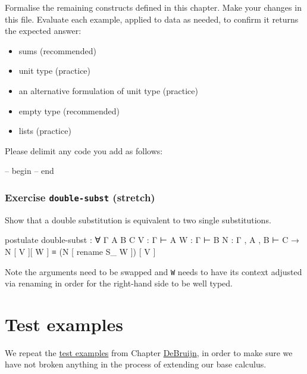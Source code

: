 Formalise the remaining constructs defined in this chapter. Make your
changes in this file. Evaluate each example, applied to data as needed,
to confirm it returns the expected answer:

\begin{itemize}
\tightlist
\item
  sums (recommended)
\item
  unit type (practice)
\item
  an alternative formulation of unit type (practice)
\item
  empty type (recommended)
\item
  lists (practice)
\end{itemize}

Please delimit any code you add as follows:

\begin{myDisplay}
-- begin
-- end
\end{myDisplay}

\hypertarget{exercise-double-subst-stretch}{%
\subsubsection{\texorpdfstring{Exercise \texttt{double-subst}
(stretch)}{Exercise double-subst (stretch)}}\label{exercise-double-subst-stretch}}

Show that a double substitution is equivalent to two single
substitutions.

\begin{fence}
\begin{code}
postulate
  double-subst :
    ∀ {Γ A B C} {V : Γ ⊢ A} {W : Γ ⊢ B} {N : Γ , A , B ⊢ C} →
      N [ V ][ W ] ≡ (N [ rename S_ W ]) [ V ]
\end{code}
\end{fence}

Note the arguments need to be swapped and \texttt{W} needs to have its
context adjusted via renaming in order for the right-hand side to be
well typed.

\hypertarget{test-examples}{%
\section{Test examples}\label{test-examples}}

We repeat the \protect\hyperlink{DeBruijn-examples}{test examples} from
Chapter \protect\hyperlink{DeBruijn}{DeBruijn}, in order to make sure we
have not broken anything in the process of extending our base calculus.

